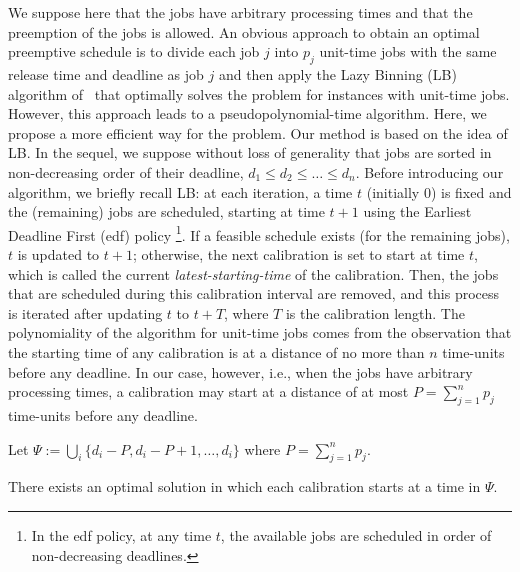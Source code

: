 We suppose here that the jobs have arbitrary processing times and that the preemption of the jobs is allowed. An obvious approach to obtain an optimal preemptive schedule is to divide each job $j$ into $p_j$ unit-time jobs with the same release time and deadline as job $j$ and then apply the Lazy Binning (LB) algorithm of~\cite{bender2013efficient} that optimally solves the problem for instances with unit-time jobs. However,  this approach leads to a pseudopolynomial-time algorithm. Here, we propose a more efficient way for the problem. Our method is based on the idea of LB. In the sequel, we suppose without loss of generality that jobs are sorted in non-decreasing order of their deadline, $d_1\leq d_2 \leq \ldots \leq d_n$. Before introducing our algorithm, we briefly recall LB:
at each iteration, a time $t$ (initially 0) is fixed and the (remaining) jobs are scheduled, starting at time $t+1$ using the Earliest Deadline First {\sc (edf)} policy \footnote{In the {\sc edf} policy, at any time $t$, the available jobs are scheduled in order of non-decreasing deadlines.}. 
If a feasible schedule exists (for the remaining jobs), $t$ is updated to $t+1$; otherwise, the next calibration is set to start at time $t$, which is called the current {\em latest-starting-time} of the calibration. Then, the jobs that are scheduled during this calibration interval are removed, and this process is iterated after updating $t$ to $t+T$, where $T$ is the calibration length. The polynomiality of the algorithm for unit-time jobs comes from the observation that the starting time of any calibration is at a distance of no more than  $n$ time-units before any deadline.
In our case, however, i.e., when the jobs have arbitrary processing times, a calibration may start at a distance of at most  $P=\sum_{j=1}^n p_j$ time-units before any deadline.




\begin{definition}\label{def:psi}
Let $\Psi := \bigcup_i \{ d_i-P,d_i-P+1,\ldots, d_i \}$ where $P=\sum_{j=1}^n p_j$.
\end{definition}

\begin{prop}\label{prop:position_calibration}
There exists an optimal solution in which each calibration starts at a time in $\Psi$.
\end{prop}

